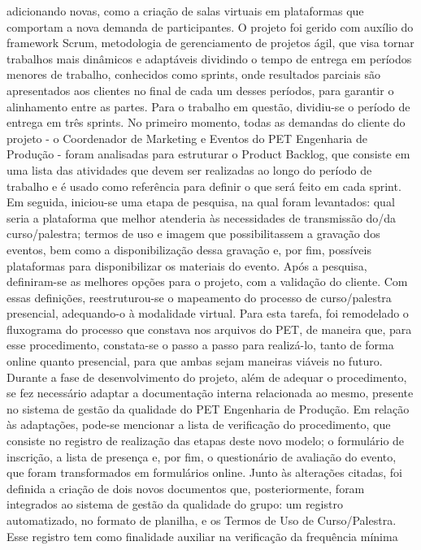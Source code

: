 adicionando novas, como a criação de salas virtuais em plataformas que comportam a nova 
demanda de participantes.
O projeto foi gerido com auxílio do framework Scrum, metodologia de gerenciamento de projetos 
ágil, que visa tornar trabalhos mais dinâmicos e adaptáveis dividindo o tempo de entrega em 
períodos menores de trabalho, conhecidos como sprints, onde resultados parciais são apresentados 
aos clientes no final de cada um desses períodos, para garantir o alinhamento entre as partes. Para 
o trabalho em questão, dividiu-se o período de entrega em três sprints. No primeiro momento, 
todas as demandas do cliente do projeto - o Coordenador de Marketing e Eventos do PET 
Engenharia de Produção - foram analisadas para estruturar o Product Backlog, que consiste em 
uma lista das atividades que devem ser realizadas ao longo do período de trabalho e é usado como 
referência para definir o que será feito em cada sprint. Em seguida, iniciou-se uma etapa de 
pesquisa, na qual foram levantados: qual seria a plataforma que melhor atenderia às necessidades 
de transmissão do/da curso/palestra; termos de uso e imagem que possibilitassem a gravação dos 
eventos, bem como a disponibilização dessa gravação e, por fim, possíveis plataformas para 
disponibilizar os materiais do evento.
Após a pesquisa, definiram-se as melhores opções para o projeto, com a validação do cliente. Com 
essas definições, reestruturou-se o mapeamento do processo de curso/palestra presencial, 
adequando-o à modalidade virtual. Para esta tarefa, foi remodelado o fluxograma do processo que 
constava nos arquivos do PET, de maneira que, para esse procedimento, constata-se o passo a 
passo para realizá-lo, tanto de forma online quanto presencial, para que ambas sejam maneiras 
viáveis no futuro.
Durante a fase de desenvolvimento do projeto, além de adequar o procedimento, se fez necessário 
adaptar a documentação interna relacionada ao mesmo, presente no sistema de gestão da qualidade 
do PET Engenharia de Produção. Em relação às adaptações, pode-se mencionar a lista de 
verificação do procedimento, que consiste no registro de realização das etapas deste novo modelo; 
o formulário de inscrição, a lista de presença e, por fim, o questionário de avaliação do evento, 
que foram transformados em formulários online. Junto às alterações citadas, foi definida a criação 
de dois novos documentos que, posteriormente, foram integrados ao sistema de gestão da 
qualidade do grupo: um registro automatizado, no formato de planilha, e os Termos de Uso de 
Curso/Palestra. Esse registro tem como finalidade auxiliar na verificação da frequência mínima 
